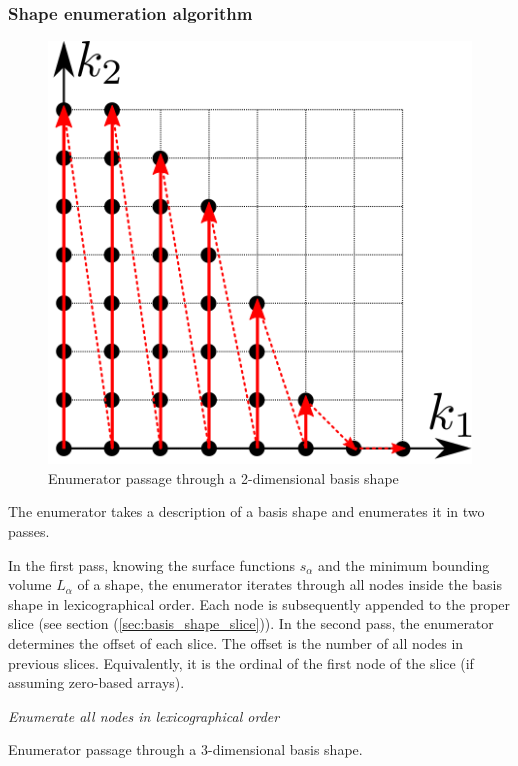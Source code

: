 \documentclass{article}
\begin{document}
\subsubsection{Shape enumeration algorithm}

\begin{figure}[H]
  \centering
  \includegraphics[]{shape_enumerator}
  \caption{Enumerator passage through a 2-dimensional basis shape}
  \label{fig:shape_enumerator}
\end{figure}

The enumerator takes a description of a basis shape and enumerates it in two passes.

In the first pass, knowing the surface functions \(s_{\alpha}\)
and the minimum bounding volume \(L_{\alpha}\) of a shape,
the enumerator iterates through all nodes inside the basis shape in lexicographical order.
Each node is subsequently appended to the proper slice (see section (\ref{sec:basis_shape_slice})).
In the second pass, the enumerator determines the offset of each slice.
The offset is the number of all nodes in previous slices. Equivalently, it is the
ordinal of the first node of the slice (if assuming zero-based arrays).

\begin{algorithm}[H]
  \emph{Enumerate all nodes in lexicographical order}\;
  \caption{Enumerator passage through a 3-dimensional basis shape.}
  \label{fig:enumerator_pass_3d}
\end{algorithm}
\end{document}

